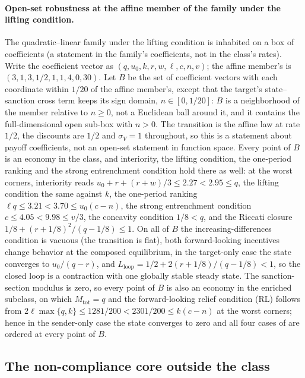 \paragraph{Open-set robustness at the affine member of the family under the lifting condition.}
\label{app:witness:openbox}
The quadratic--linear family under the lifting condition is inhabited on a box of coefficients
(a statement in the family's coefficients, not in the class's rates). Write the
coefficient vector as $(q,u_0,k,r,w,\ell,c,n,v)$; the affine member's is
$(3,1,3,1/2,1,1,4,0,30)$. Let $B$ be the set of coefficient vectors with each
coordinate within $1/20$ of the affine member's,
except that the target's state--sanction cross term keeps its sign domain, $n\in[0,1/20]$: $B$
is a neighborhood of the member relative to $n\ge0$, not a Euclidean ball
around it, and it contains the full-dimensional open sub-box with $n>0$.
The transition is the affine law at rate $1/2$, the discounts are $1/2$ and
$\sigma_V=1$ throughout, so this is a statement about payoff coefficients,
not an open-set statement in function space. Every point of $B$ is an
economy in the class, and interiority, the lifting condition, the one-period ranking and the strong
entrenchment condition hold there as well: at the worst corners, interiority reads
$u_0+r+(r+w)/3\le2.27<2.95\le q$, the lifting condition the same against $k$, the
one-period ranking $\ell q\le3.21<3.70\le u_0(c-n)$, the strong entrenchment condition
$c\le4.05<9.98\le v/3$, the concavity condition $1/8<q$, and the Riccati closure
$1/8+(r+1/8)^2/(q-1/8)\le1$. On all of $B$ the increasing-differences condition is vacuous
(the transition is flat), both forward-looking incentives change behavior at
the composed equilibrium, in the target-only case the state converges to $u_0/(q-r)$,
and $L_{\mathrm{loop}}=1/2+2(r+1/8)/(q-1/8)<1$, so the closed loop is a
contraction with one globally stable steady state. The sanction-section
modulus is zero, so every point of $B$ is also an economy in the enriched
subclass, on which $M_{\mathrm{tot}}=q$ and the forward-looking relief condition \textup{(RL)} follows from
$2\ell\max\{q,k\}\le1281/200<2301/200\le k(c-n)$ at the worst corners;
hence in the sender-only case the state converges to zero and all four cases of
 are ordered at every point of $B$.

\subsection{The non-compliance core outside the class}
\label{app:witness:outside-chord}

